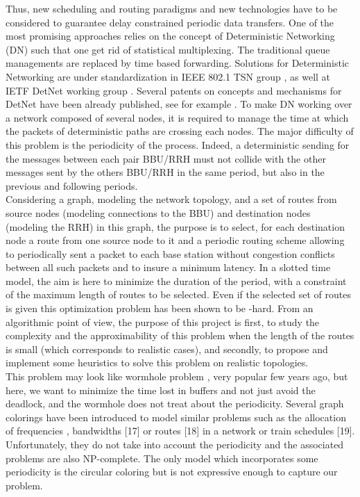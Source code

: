 \documentclass[a4paper,10pt]{article}
\begin{document}
 Thus, new scheduling and routing paradigms and new technologies have to be considered to  guarantee  delay constrained periodic data transfers. One of the most promising approaches relies on the concept of Deterministic Networking (DN) such that one get rid of
 statistical multiplexing. The traditional queue managements are replaced by time based forwarding. Solutions for Deterministic
 Networking are under standardization in IEEE 802.1 TSN group \cite{FT16}, as well at IETF DetNet working group \cite{ieee802}. Several patents on concepts and mechanisms for DetNet have been already published, see for example \cite{Ho05,LM16}. To make DN working over a
 network composed of several nodes, it is required to manage the time at which the packets of deterministic paths are crossing each nodes. The major difficulty of this problem is the periodicity of the process. Indeed, a deterministic sending for the messages
between each pair BBU/RRH must not collide with the other messages sent by the others BBU/RRH in the same period, but also in the previous
and following periods.\\

Considering a graph, modeling the network topology, and a set of routes from source nodes (modeling connections to the BBU) and destination
nodes (modeling the RRH) in this graph, the purpose is to select, for each destination node a route from one source node to it and a periodic
routing scheme allowing to periodically sent a packet to each base station without congestion conflicts between all such packets and to insure a minimum latency. In a slotted time model, the aim is here to minimize the duration of the period, with a constraint of the maximum length of routes to be
selected. Even if the selected set of routes is given this optimization problem has been shown to be  \NP-hard. From an algorithmic point of view,
the purpose of this project is first, to study the complexity and the approximability of this problem when the length of the routes is small
(which corresponds to realistic cases), and secondly, to propose and implement some heuristics to solve this problem on realistic topologies.\\


This problem may look like wormhole problem \cite{cole1996benefit}, very popular few years ago, but here, we want to minimize the time lost in buffers and not just avoid the deadlock, and the wormhole does not treat about the periodicity. Several graph colorings have been introduced to model similar problems such as the allocation of frequencies \cite{BM98}, bandwidths \cite{EJ01}[17] or routes \cite{CS96}[18] in a network or train schedules \cite{St07}[19]. Unfortunately, they do not take into account the periodicity and the associated problems are also NP-complete. The only model which incorporates some periodicity is the circular coloring \cite{Zho13, Zhu01,Zhu06}but is not expressive enough to capture our problem.
\end{document}
